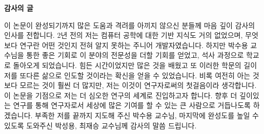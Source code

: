 
\begin{center}
    {\huge \bfseries 감사의 글 \par}
\end{center}
\vspace{1.5cm}

이 논문이 완성되기까지 많은 도움과 격려를 아끼지 않으신 분들께 마음 깊이 감사의 인사를 전합니다. 
2년 전의 저는 컴퓨터 공학에 대한 기반 지식도 거의 없었으며, 무엇보다 연구란 어떤 것인지 전혀 알지 못하는 주니어 개발자였습니다.
하지만 박수용 교수님을 통한 좋은 기회로 이 분야의 전문성을 더할 기회를 얻었고, 석사 과정으로 학교로 돌아오게 되었습니다.
힘든 시간이었지만 많은 것을 배웠고 또 이러한 학문의 길이 저를 또다른 삶으로 인도할 것이라는 확신을 얻을 수 있었습니다.
비록 여전히 아는 것 보다 모르는 것이 훨씬 더 많지만, 저는 이것이 연구자로써의 첫걸음이라 생각합니다.
이 논문을 기점으로 저는 더 심오한 연구의 세계로 진입하고자 합니다.
향후 더 깊이있는 연구를 통해 연구자로서 세상에 많은 기여를 할 수 있는 큰 사람으로 거듭나도록 하겠습니다.
부족한 저를 끝까지 지도해 주신 박수용 교수님, 마지막에 완성도를 높일 수 있도록 도와주신 박성용, 최재승 교수님께 감사의 말씀 드립니다.

\clearpage
